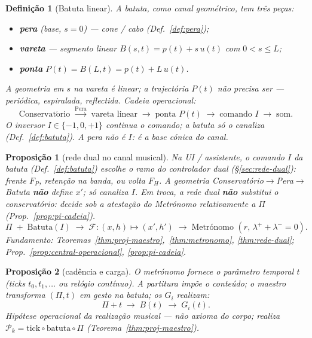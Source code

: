 \documentclass[11pt,a4paper]{article}
\newtheorem{definicao}{Definição}
\newtheorem{proposicao}{Proposição}
\begin{document}
\begin{definicao}[Batuta linear]\label{def:batuta-linear}
A batuta, como canal geométrico, tem três peças:
\begin{itemize}
\item \textbf{pera} (base, $s=0$) --- cone / cabo (Def.~\ref{def:pera});
\item \textbf{vareta} --- segmento linear
$B(s,t)=p(t)+s\,u(t)$ com $0<s\le L$;
\item \textbf{ponta} $P(t)=B(L,t)=p(t)+L\,u(t)$.
\end{itemize}
A geometria em $s$ na vareta é linear; a trajectória $P(t)$ não precisa
ser --- periódica, espiralada, reflectida. Cadeia operacional:
\[
\boxed{
\mathrm{Conservat\acute{o}rio}
\;\xrightarrow{\mathrm{Pera}}\;
\text{vareta linear}
\;\rightarrow\;
\text{ponta }P(t)
\;\rightarrow\;
\text{comando }I
\;\rightarrow\;
\text{som}.
}
\]
O inversor $I\in\{-1,0,+1\}$ continua o comando; a batuta só o
canaliza (Def.~\ref{def:batuta}). A pera não é $I$: é a base cónica
do canal.
\end{definicao}

\begin{proposicao}[rede dual no canal musical]\label{prop:rede-no-canal}
Na UI / assistente, o comando $I$ da batuta (Def.~\ref{def:batuta})
escolhe o ramo do controlador dual
(\S\ref{sec:rede-dual}): frente $F_P$, retenção na banda, ou volta
$F_H$. A geometria Conservatório$\to$Pera$\to$Batuta \textbf{não}
define $x'$; só canaliza $I$. Em troca, a rede dual \textbf{não}
substitui o conservatório: decide sob a atestação do Metrónomo
relativamente a $\Pi$ (Prop.~\ref{prop:pi-cadeia}).
\[
\boxed{
\Pi
\;+\;
\mathrm{Batuta}(I)
\;\longrightarrow\;
\mathcal{F}\colon(x,h)\mapsto(x',h')
\;\longrightarrow\;
\text{Metrónomo }(r,\,\lambda^{+}+\lambda^{-}=0).
}
\]
Fundamento: Teoremas~\ref{thm:proj-maestro},~\ref{thm:metronomo},
\ref{thm:rede-dual}; Prop.~\ref{prop:central-operacional},
\ref{prop:pi-cadeia}.
\end{proposicao}

\begin{proposicao}[cadência e carga]\label{prop:tick-carga}
O metrónomo fornece o parâmetro temporal $t$ (ticks $t_0,t_1,\ldots$
ou relógio contínuo). A partitura impõe o conteúdo; o maestro
transforma $(\Pi,t)$ em gesto na batuta; os $G_i$ realizam:
\[
\boxed{
\Pi+t
\;\longrightarrow\;
B(t)
\;\longrightarrow\;
G_i(t).
}
\]
Hipótese operacional da realização musical --- não axioma do corpo;
realiza $\mathcal{P}_k=\mathrm{tick}\circ\mathrm{batuta}\circ\Pi$
(Teorema~\ref{thm:proj-maestro}).
\end{proposicao}
\end{document}
